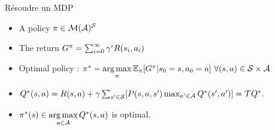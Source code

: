 \documentclass[french]{beamer}
\begin{document}
    \begin{frame}{Résoudre un MDP}
        \begin{itemize}
            \item A policy $\pi\in\mathcal{M}(\mathcal{A})^{\mathcal{S}}$ %
            \item The return $G^{\pi} = \sum_{i=0}^\infty \gamma^{i} R(s_{i},a_{i})$%
            \item Optimal policy :  $\pi^* = \operatorname*{arg\,max}\limits_{\pi} \mathbb{E}_{\pi} [G^{\pi}|s_0=s,a_0=a]\ \forall (s,a) \in \mathcal{S}\times\mathcal{A}$

            \item $Q^*(s,a)=R(s,a) +\gamma \sum_{s'\in \mathcal{S}}[P(s,a,s')\max_{a'\in \mathcal{A}}Q^*(s',a')] = \mathcal{T} Q^*.$

            \item $\pi^*(s) \in \operatorname*{arg\,max}\limits_{a\in \mathcal{A}} Q^*(s,a)$ is optimal.
        \end{itemize}


    \end{frame}
\end{document}
